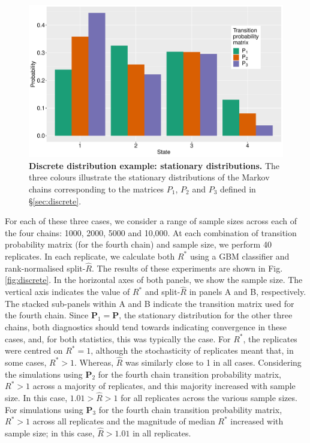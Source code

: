 \documentclass[ba]{imsart}
\numberwithin{equation}{section}
\theoremstyle{plain}
\begin{document}
\begin{supplement}
		\begin{figure}[!htb]
			\centerline{\includegraphics[width=1.0\textwidth]{discrete_stationary.pdf}}
			\caption{\textbf{Discrete distribution example: stationary distributions.} The three colours illustrate the stationary distributions of the Markov chains corresponding to the matrices $P_1$, $P_2$ and $P_3$ defined in \S\ref{sec:discrete}.}
			\label{fig:discrete_stationary}
		\end{figure}
		
		For each of these three cases, we consider a range of sample sizes across each of the four chains: 1000, 2000, 5000 and 10,000. At each combination of transition probability matrix (for the fourth chain) and sample size, we perform 40 replicates. In each replicate, we calculate both $R^*$ using a GBM classifier and rank-normalised split-$\widehat{R}$. The results of these experiments are shown in Fig. \ref{fig:discrete}. In the horizontal axes of both panels, we show the sample size. The vertical axis indicates the value of $R^*$ and split-$\widehat{R}$ in panels A and B, respectively. The stacked sub-panels within A and B indicate the transition matrix used for the fourth chain. Since $\boldsymbol{P}_1=\boldsymbol{P}$, the stationary distribution for the other three chains, both diagnostics should tend towards indicating convergence in these cases, and, for both statistics, this was typically the case. For $R^*$, the replicates were centred on $R^*=1$, although the stochasticity of replicates meant that, in some cases, $R^*>1$. Whereas, $\widehat{R}$ was similarly close to 1 in all cases. Considering the simulations using $\boldsymbol{P}_2$ for the fourth chain transition probability matrix, $R^*>1$ across a majority of replicates, and this majority increased with sample size. In this case, $1.01>\widehat{R}>1$ for all replicates across the various sample sizes. For simulations using $\boldsymbol{P}_3$ for the fourth chain transition probability matrix, $R^*>1$ across all replicates and the magnitude of median $R^*$ increased with sample size; in this case, $\widehat{R}>1.01$ in all replicates.
		

\end{supplement}
\end{document}
